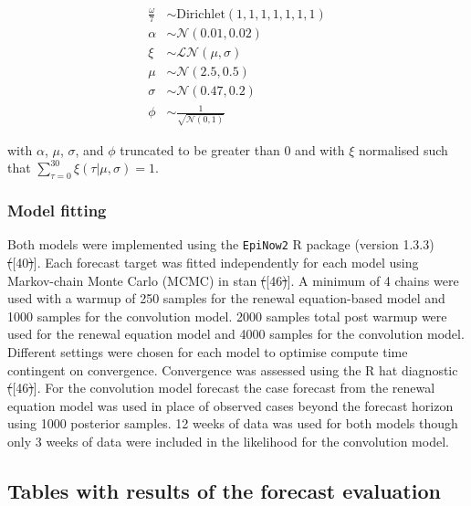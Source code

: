 \documentclass[10pt,letterpaper]{article} %
\providecommand{\DIFdeltex}[1]{{\protect\color{red}\sout{#1}}}                      %
\providecommand{\DIFaddbegin}{} %
\providecommand{\DIFaddend}{} %
\providecommand{\DIFdelbegin}{} %
\providecommand{\DIFdelend}{} %
\providecommand{\DIFdel}[1]{\texorpdfstring{\DIFdeltex{#1}}{}} %
\newcommand{\DIFscaledelfig}{0.5}
\newlength{\DIFdelgraphicswidth} %
\newlength{\DIFdelgraphicsheight} %
\newcommand{\DIFaddincludegraphics}[2][]{{\color{blue}\fbox{\DIFOincludegraphics[#1]{#2}}}} %
\newcommand{\DIFdelincludegraphics}[2][]{%
\sbox{\DIFdelgraphicsbox}{\DIFOincludegraphics[#1]{#2}}%
\settoboxwidth{\DIFdelgraphicswidth}{\DIFdelgraphicsbox} %
\settoboxtotalheight{\DIFdelgraphicsheight}{\DIFdelgraphicsbox} %
\scalebox{\DIFscaledelfig}{%
\parbox[b]{\DIFdelgraphicswidth}{\usebox{\DIFdelgraphicsbox}\\[-\baselineskip] \rule{\DIFdelgraphicswidth}{0em}}\llap{\resizebox{\DIFdelgraphicswidth}{\DIFdelgraphicsheight}{%
\setlength{\unitlength}{\DIFdelgraphicswidth}%
\begin{picture}(1,1)%
\thicklines\linethickness{2pt} %
{\color[rgb]{1,0,0}\put(0,0){\framebox(1,1){}}}%
{\color[rgb]{1,0,0}\put(0,0){\line( 1,1){1}}}%
{\color[rgb]{1,0,0}\put(0,1){\line(1,-1){1}}}%
\end{picture}%
}\hspace*{3pt}}} %
} %
\DeclareRobustCommand{\DIFaddbegin}{\DIFOaddbegin \let\includegraphics\DIFaddincludegraphics} %
\DeclareRobustCommand{\DIFaddend}{\DIFOaddend \let\includegraphics\DIFOincludegraphics} %
\DeclareRobustCommand{\DIFdelbegin}{\DIFOdelbegin \let\includegraphics\DIFdelincludegraphics} %
\DeclareRobustCommand{\DIFdelend}{\DIFOaddend \let\includegraphics\DIFOincludegraphics} %
\begin{document}
\begin{align}
    \frac{\omega}{7} &\sim \mathrm{Dirichlet}(1, 1, 1, 1, 1, 1, 1) \\
    \alpha &\sim \mathcal{N}(0.01, 0.02) \\
    \xi &\sim \mathcal{LN}(\mu, \sigma) \\
    \mu &\sim \mathcal{N}(2.5, 0.5) \\
\sigma &\sim \mathcal{N}(0.47, 0.2) \\
\phi &\sim \frac{1}{\sqrt{\mathcal{N}(0, 1)}}
\end{align}

with \(\alpha\), \(\mu\), \(\sigma\), and \(\phi\) truncated to be
greater than 0 and with \(\xi\) normalised such that
\(\sum_{\tau = 0}^{30} \xi(\tau | \mu, \sigma) = 1\).

\hypertarget{model-fitting}{%
\subsubsection{Model fitting}\label{model-fitting}}

Both models were implemented using the \texttt{EpiNow2} R package
(version 1.3.3) \DIFdelbegin \DIFdel{(}\DIFdelend \DIFaddbegin {[}\DIFaddend 40\DIFdelbegin \DIFdel{)}\DIFdelend \DIFaddbegin {]}\DIFaddend . Each forecast target was fitted independently
for each model using Markov-chain Monte Carlo (MCMC) in stan \DIFdelbegin \DIFdel{(}\DIFdelend \DIFaddbegin {[}\DIFaddend 46\DIFdelbegin \DIFdel{)}\DIFdelend \DIFaddbegin {]}\DIFaddend . A
minimum of 4 chains were used with a warmup of 250 samples for the
renewal equation-based model and 1000 samples for the convolution model.
2000 samples total post warmup were used for the renewal equation model
and 4000 samples for the convolution model. Different settings were
chosen for each model to optimise compute time contingent on
convergence. Convergence was assessed using the R hat diagnostic
\DIFdelbegin \DIFdel{(}\DIFdelend \DIFaddbegin {[}\DIFaddend 46\DIFdelbegin \DIFdel{)}\DIFdelend \DIFaddbegin {]}\DIFaddend . For the convolution model forecast the case forecast from the
renewal equation model was used in place of observed cases beyond the
forecast horizon using 1000 posterior samples. 12 weeks of data was used
for both models though only 3 weeks of data were included in the
likelihood for the convolution model.

\clearpage

\hypertarget{tables-with-results-of-the-forecast-evaluation}{%
\subsection{Tables with results of the forecast
evaluation}\label{tables-with-results-of-the-forecast-evaluation}}
\end{document}
